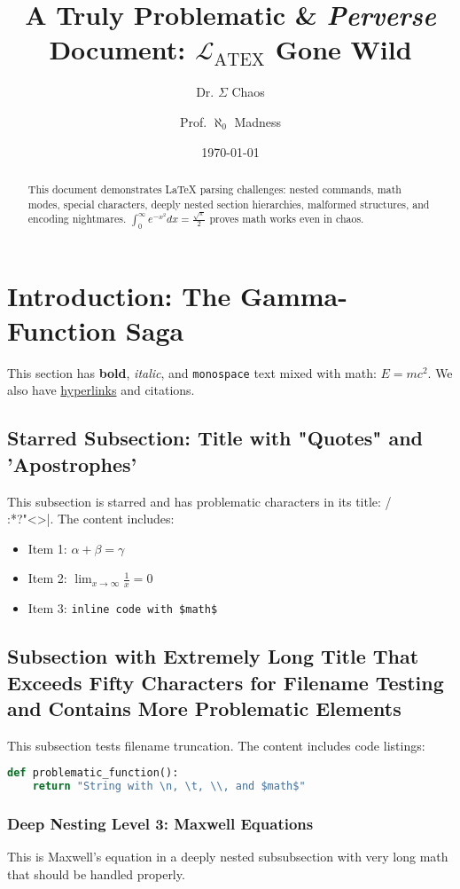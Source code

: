 \documentclass[12pt,a4paper]{article}
\title{A \textbf{Truly} Problematic \& \textit{Perverse} Document: \texorpdfstring{$\mathcal{L}_{\text{ATEX}}$}{LATEX} Gone Wild}
\author{Dr. \texorpdfstring{$\Sigma$}{Sigma} Chaos \and Prof. $\aleph_0$ Madness}
\date{\today}
\begin{document}
\maketitle

\begin{abstract}
This document demonstrates \LaTeX{} parsing challenges: nested commands, math modes, special characters, deeply nested section hierarchies, malformed structures, and encoding nightmares. $\int_{0}^{\infty} e^{-x^2} dx = \frac{\sqrt{\pi}}{2}$ proves math works even in chaos.
\end{abstract}

\section{Introduction: The Gamma-Function Saga}
This section has \textbf{bold}, \textit{italic}, and \texttt{monospace} text mixed with math: $E = mc^2$. We also have \href{https://example.com}{hyperlinks} and \cite{fake_ref} citations.

\subsection*{Starred Subsection: Title with "Quotes" and 'Apostrophes'}
This subsection is starred and has problematic characters in its title: /\\:*?"<>|. The content includes:
\begin{itemize}
\item Item 1: $\alpha + \beta = \gamma$
\item Item 2: $\lim_{x \to \infty} \frac{1}{x} = 0$
\item Item 3: \verb|inline code with $math$|
\end{itemize}

\subsection{Subsection with Extremely Long Title That Exceeds Fifty Characters for Filename Testing and Contains More Problematic Elements}
This subsection tests filename truncation. The content includes code listings:

\begin{lstlisting}[language=Python]
def problematic_function():
    return "String with \n, \t, \\, and $math$"
\end{lstlisting}

\subsubsection{Deep Nesting Level 3: Maxwell Equations}
This is Maxwell's equation in a deeply nested subsubsection with very long math that should be handled properly.
\end{document}
